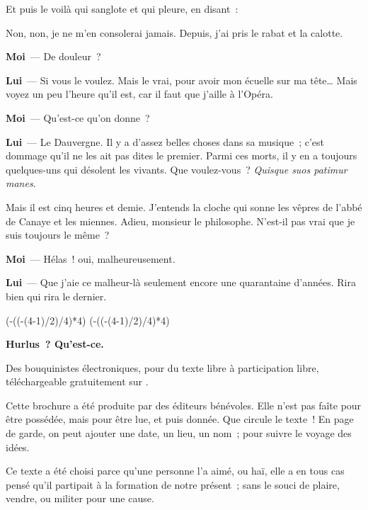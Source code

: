 \documentclass[french,twoside]{book} %
\newcommand{\labelchar}[1]{\textbf{\color{rubric} #1}}
\def\truncdiv#1#2{((#1-(#2-1)/2)/#2)}
\def\moduloop#1#2{(#1-\truncdiv{#1}{#2}*#2)}
\def\modulo#1#2{\number\numexpr\moduloop{#1}{#2}\relax}
\begin{document}
Et puis le voilà qui sanglote et qui pleure, en disant :\par
Non, non, je ne m’en consolerai jamais. Depuis, j’ai pris le rabat et la calotte.\par
\labelchar{Moi} — De douleur ?\par
\labelchar{Lui} — Si vous le voulez. Mais le vrai, pour avoir mon écuelle sur ma tête… Mais voyez un peu l’heure qu’il est, car il faut que j’aille à l’Opéra.\par
\labelchar{Moi} — Qu’est-ce qu’on donne ?\par
\labelchar{Lui} — Le Dauvergne. Il y a d’assez belles choses dans sa musique ; c’est dommage qu’il ne les ait pas dites le premier. Parmi ces morts, il y en a toujours quelques-uns qui désolent les vivants. Que voulez-vous ? \emph{Quisque suos patimur manes}.\par
Mais il est cinq heures et demie. J’entends la cloche qui sonne les vêpres de l’abbé de Canaye et les miennes. Adieu, monsieur le philosophe. N’est-il pas vrai que je suis toujours le même ?\par
\labelchar{Moi} — Hélas ! oui, malheureusement.\par
\labelchar{Lui} — Que j’aie ce malheur-là seulement encore une quarantaine d’années. Rira bien qui rira le dernier.
 


\ifbooklet
  \pagestyle{empty}
  \clearpage
  \ifnum\modulo{\value{page}}{4}=0 \hbox{}\newpage\hbox{}\newpage\fi
  \ifnum\modulo{\value{page}}{4}=1 \hbox{}\newpage\hbox{}\newpage\fi


  \hbox{}\newpage
  \ifodd\value{page}\hbox{}\newpage\fi
  {\centering\color{rubric}\bfseries\noindent\large
    Hurlus ? Qu’est-ce.\par
    \bigskip
  }
  \noindent Des bouquinistes électroniques, pour du texte libre à participation libre,
  téléchargeable gratuitement sur \href{https://hurlus.fr}{}.\par
  \bigskip
  \noindent Cette brochure a été produite par des éditeurs bénévoles.
  Elle n’est pas faîte pour être possédée, mais pour être lue, et puis donnée.
  Que circule le texte !
  En page de garde, on peut ajouter une date, un lieu, un nom ; pour suivre le voyage des idées.
  \par

  Ce texte a été choisi parce qu’une personne l’a aimé,
  ou haï, elle a en tous cas pensé qu’il partipait à la formation de notre présent ;
  sans le souci de plaire, vendre, ou militer pour une cause.
  \par
\end{document}

